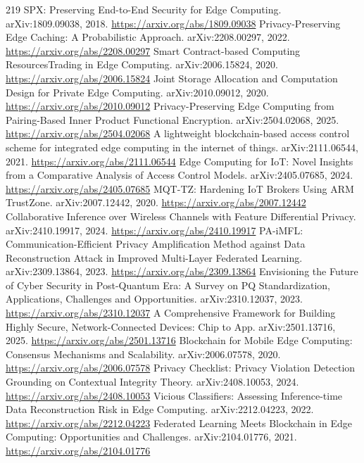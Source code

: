 \documentclass[11pt]{article}
\begin{document}
\begin{thebibliography}{219}
 SPX: Preserving End-to-End Security for Edge Computing. arXiv:1809.09038, 2018. \url{https://arxiv.org/abs/1809.09038}
 Privacy-Preserving Edge Caching: A Probabilistic Approach. arXiv:2208.00297, 2022. \url{https://arxiv.org/abs/2208.00297}
 Smart Contract-based Computing ResourcesTrading in Edge Computing. arXiv:2006.15824, 2020. \url{https://arxiv.org/abs/2006.15824}
 Joint Storage Allocation and Computation Design for Private Edge Computing. arXiv:2010.09012, 2020. \url{https://arxiv.org/abs/2010.09012}
 Privacy-Preserving Edge Computing from Pairing-Based Inner Product Functional Encryption. arXiv:2504.02068, 2025. \url{https://arxiv.org/abs/2504.02068}
 A lightweight blockchain-based access control scheme for integrated edge computing in the internet of things. arXiv:2111.06544, 2021. \url{https://arxiv.org/abs/2111.06544}
 Edge Computing for IoT: Novel Insights from a Comparative Analysis of Access Control Models. arXiv:2405.07685, 2024. \url{https://arxiv.org/abs/2405.07685}
 MQT-TZ: Hardening IoT Brokers Using ARM TrustZone. arXiv:2007.12442, 2020. \url{https://arxiv.org/abs/2007.12442}
 Collaborative Inference over Wireless Channels with Feature Differential Privacy. arXiv:2410.19917, 2024. \url{https://arxiv.org/abs/2410.19917}
 PA-iMFL: Communication-Efficient Privacy Amplification Method against Data Reconstruction Attack in Improved Multi-Layer Federated Learning. arXiv:2309.13864, 2023. \url{https://arxiv.org/abs/2309.13864}
 Envisioning the Future of Cyber Security in Post-Quantum Era: A Survey on PQ Standardization, Applications, Challenges and Opportunities. arXiv:2310.12037, 2023. \url{https://arxiv.org/abs/2310.12037}
 A Comprehensive Framework for Building Highly Secure, Network-Connected Devices: Chip to App. arXiv:2501.13716, 2025. \url{https://arxiv.org/abs/2501.13716}
 Blockchain for Mobile Edge Computing: Consensus Mechanisms and Scalability. arXiv:2006.07578, 2020. \url{https://arxiv.org/abs/2006.07578}
 Privacy Checklist: Privacy Violation Detection Grounding on Contextual Integrity Theory. arXiv:2408.10053, 2024. \url{https://arxiv.org/abs/2408.10053}
 Vicious Classifiers: Assessing Inference-time Data Reconstruction Risk in Edge Computing. arXiv:2212.04223, 2022. \url{https://arxiv.org/abs/2212.04223}
 Federated Learning Meets Blockchain in Edge Computing: Opportunities and Challenges. arXiv:2104.01776, 2021. \url{https://arxiv.org/abs/2104.01776}

\end{thebibliography}
\end{document}
